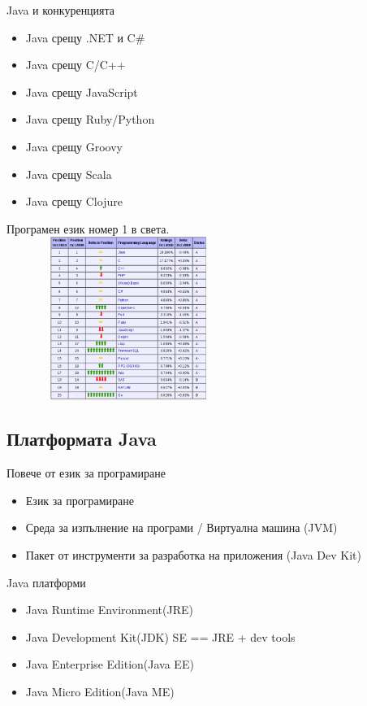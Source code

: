\documentclass{beamer}
\begin{document}
\begin{frame}{Java и конкуренцията}
  \begin{itemize}
    \item Java срещу .NET и C\#
    \item Java срещу C/C++
    \item Java срещу JavaScript
    \item Java срещу Ruby/Python
    \item Java срещу Groovy
    \item Java срещу Scala
    \item Java срещу Clojure
  \end{itemize}
\end{frame}

\begin{frame}{Програмен език номер 1 в света.}
  \includegraphics[width=300px,
  height=200px]{images/lang-current}
\end{frame}

\subsection{Платформата Java}

\begin{frame}{Повече от език за програмиране}

  \begin{itemize}
    \item Език за програмиране
    \item Среда за изпълнение на програми / Виртуална машина (JVM)
    \item Пакет от инструменти за разработка на приложения (Java Dev Kit)
  \end{itemize}

\end{frame}


\begin{frame}{Java платформи}
  \begin{itemize}
    \item Java Runtime Environment(JRE)
    \item Java Development Kit(JDK) SE == JRE + dev tools
    \item Java Enterprise Edition(Java EE)
    \item Java Micro Edition(Java ME)
  \end{itemize}
\end{frame}
\end{document}
